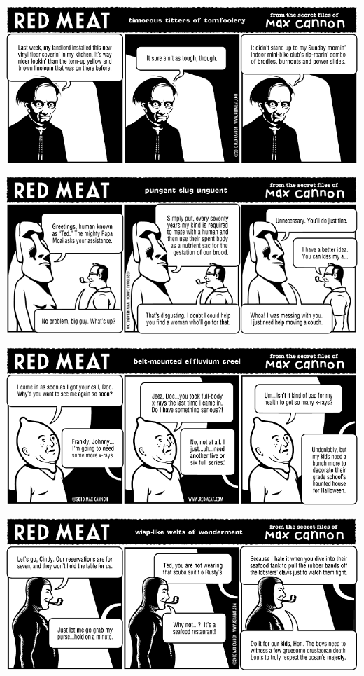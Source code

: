 \documentclass[a4paper,twoside,11pt]{article}
\begin{document}
\includegraphics[width=\textwidth]{redmeat_2010-08-24.png}



\includegraphics[width=\textwidth]{redmeat_2010-08-31.png}



\includegraphics[width=\textwidth]{redmeat_2010-09-07.png}



\includegraphics[width=\textwidth]{redmeat_2010-09-14.png}
\end{document}
